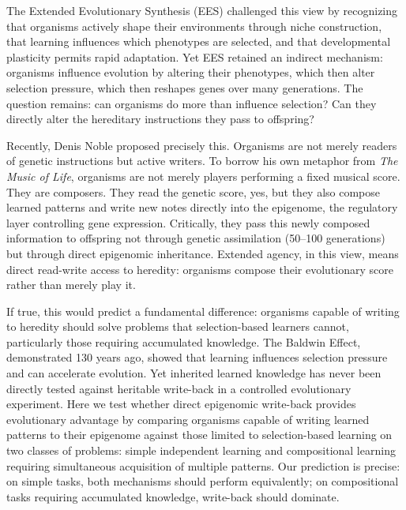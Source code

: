 \documentclass[twocolumn]{nature}
\begin{document}
The Extended Evolutionary Synthesis (EES) challenged this view by recognizing that organisms actively shape their environments through niche construction\cite{Odling-Smee2003}, that learning influences which phenotypes are selected\cite{Jablonka2005}, and that developmental plasticity permits rapid adaptation\cite{WestEberhard2003}. Yet EES retained an indirect mechanism: organisms influence evolution by altering their phenotypes, which then alter selection pressure, which then reshapes genes over many generations\cite{LalandEtAl2015}. The question remains: can organisms do more than influence selection? Can they directly alter the hereditary instructions they pass to offspring?

Recently, Denis Noble proposed precisely this\cite{Noble2017, Noble2021}. Organisms are not merely readers of genetic instructions but active writers. To borrow his own metaphor from \textit{The Music of Life}, organisms are not merely players performing a fixed musical score. They are composers. They read the genetic score, yes, but they also compose learned patterns and write new notes directly into the epigenome, the regulatory layer controlling gene expression\cite{Noble2016}. Critically, they pass this newly composed information to offspring not through genetic assimilation (50--100 generations) but through direct epigenomic inheritance\cite{JablonkaLamb2005}. Extended agency, in this view, means direct read-write access to heredity: organisms compose their evolutionary score rather than merely play it.

If true, this would predict a fundamental difference: organisms capable of writing to heredity should solve problems that selection-based learners cannot, particularly those requiring accumulated knowledge. The Baldwin Effect, demonstrated 130 years ago, showed that learning influences selection pressure and can accelerate evolution\cite{Baldwin1896}. Yet inherited learned knowledge has never been directly tested against heritable write-back in a controlled evolutionary experiment. Here we test whether direct epigenomic write-back provides evolutionary advantage by comparing organisms capable of writing learned patterns to their epigenome against those limited to selection-based learning on two classes of problems: simple independent learning and compositional learning requiring simultaneous acquisition of multiple patterns. Our prediction is precise: on simple tasks, both mechanisms should perform equivalently; on compositional tasks requiring accumulated knowledge, write-back should dominate.
\end{document}
